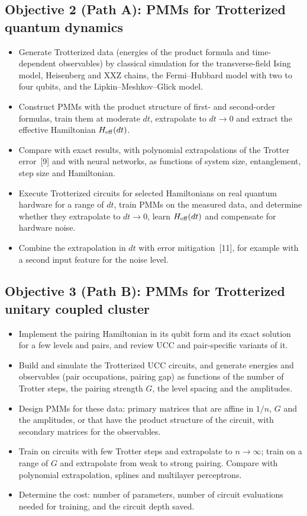 \documentclass[12pt,a4paper]{article}
\begin{document}
\subsection*{Objective 2 (Path A): PMMs for Trotterized quantum dynamics}
\begin{itemize}
  \item Generate Trotterized data (energies of the product formula and
  time-dependent observables) by classical simulation for the
  transverse-field Ising model, Heisenberg and XXZ chains, the
  Fermi--Hubbard model with two to four qubits, and the
  Lipkin--Meshkov--Glick model.
  \item Construct PMMs with the product structure of first- and
  second-order formulas, train them at moderate $dt$, extrapolate to
  $dt\to0$ and extract the effective Hamiltonian $H_{\rm eff}(dt)$.
  \item Compare with exact results, with polynomial extrapolations of
  the Trotter error~[9] and with neural networks, as functions of
  system size, entanglement, step size and Hamiltonian.
  \item Execute Trotterized circuits for selected Hamiltonians on real
  quantum hardware for a range of $dt$, train PMMs on the measured
  data, and determine whether they extrapolate to $dt\to0$, learn
  $H_{\rm eff}(dt)$ and compensate for hardware noise.
  \item Combine the extrapolation in $dt$ with error mitigation~[11],
  for example with a second input feature for the noise level.
\end{itemize}

\subsection*{Objective 3 (Path B): PMMs for Trotterized unitary coupled cluster}
\begin{itemize}
  \item Implement the pairing Hamiltonian in its qubit form and its
  exact solution for a few levels and pairs, and review UCC and
  pair-specific variants of it.
  \item Build and simulate the Trotterized UCC circuits, and generate
  energies and observables (pair occupations, pairing gap) as
  functions of the number of Trotter steps, the pairing strength $G$,
  the level spacing and the amplitudes.
  \item Design PMMs for these data: primary matrices that are affine
  in $1/n$, $G$ and the amplitudes, or that have the product structure
  of the circuit, with secondary matrices for the observables.
  \item Train on circuits with few Trotter steps and extrapolate to
  $n\to\infty$; train on a range of $G$ and extrapolate from weak to
  strong pairing.  Compare with polynomial extrapolation, splines and
  multilayer perceptrons.
  \item Determine the cost: number of parameters, number of circuit
  evaluations needed for training, and the circuit depth saved.
\end{itemize}
\end{document}
